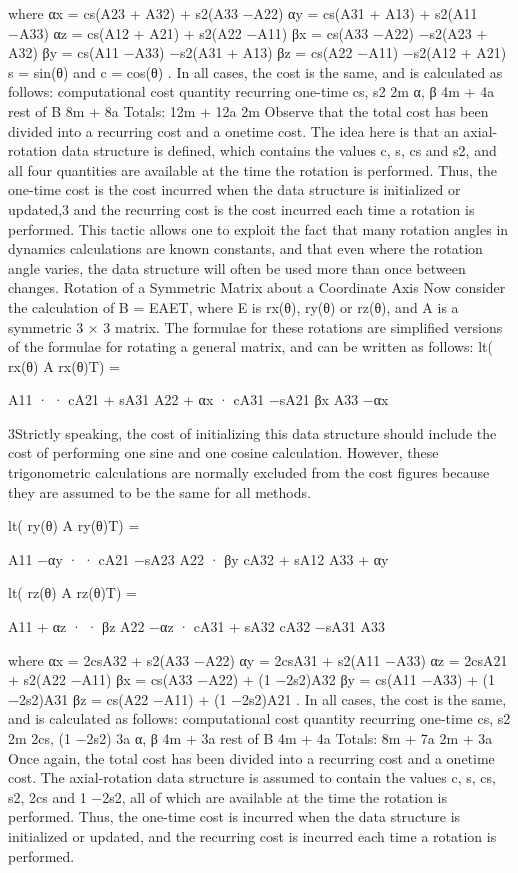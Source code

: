 where αx = cs(A23 + A32) + s2(A33 −A22) αy = cs(A31 + A13) + s2(A11 −A33) αz = cs(A12 + A21) + s2(A22 −A11) βx = cs(A33 −A22) −s2(A23 + A32) βy = cs(A11 −A33) −s2(A31 + A13) βz = cs(A22 −A11) −s2(A12 + A21) s = sin(θ) and c = cos(θ) . In all cases, the cost is the same, and is calculated as follows: computational cost quantity recurring one-time cs, s2 2m α, β 4m + 4a rest of B 8m + 8a Totals: 12m + 12a 2m Observe that the total cost has been divided into a recurring cost and a onetime cost. The idea here is that an axial-rotation data structure is defined, which contains the values c, s, cs and s2, and all four quantities are available at the time the rotation is performed. Thus, the one-time cost is the cost incurred when the data structure is initialized or updated,3 and the recurring cost is the cost incurred each time a rotation is performed. This tactic allows one to exploit the fact that many rotation angles in dynamics calculations are known constants, and that even where the rotation angle varies, the data structure will often be used more than once between changes. Rotation of a Symmetric Matrix about a Coordinate Axis Now consider the calculation of B = EAET, where E is rx(θ), ry(θ) or rz(θ), and A is a symmetric 3 × 3 matrix. The formulae for these rotations are simplified versions of the formulae for rotating a general matrix, and can be written as follows: lt( rx(θ) A rx(θ)T) =

A11 · · cA21 + sA31 A22 + αx · cA31 −sA21 βx A33 −αx

3Strictly speaking, the cost of initializing this data structure should include the cost of performing one sine and one cosine calculation. However, these trigonometric calculations are normally excluded from the cost figures because they are assumed to be the same for all methods.

lt( ry(θ) A ry(θ)T) =

A11 −αy · · cA21 −sA23 A22 · βy cA32 + sA12 A33 + αy

lt( rz(θ) A rz(θ)T) =

A11 + αz · · βz A22 −αz · cA31 + sA32 cA32 −sA31 A33

where αx = 2csA32 + s2(A33 −A22) αy = 2csA31 + s2(A11 −A33) αz = 2csA21 + s2(A22 −A11) βx = cs(A33 −A22) + (1 −2s2)A32 βy = cs(A11 −A33) + (1 −2s2)A31 βz = cs(A22 −A11) + (1 −2s2)A21 . In all cases, the cost is the same, and is calculated as follows: computational cost quantity recurring one-time cs, s2 2m 2cs, (1 −2s2) 3a α, β 4m + 3a rest of B 4m + 4a Totals: 8m + 7a 2m + 3a Once again, the total cost has been divided into a recurring cost and a onetime cost. The axial-rotation data structure is assumed to contain the values c, s, cs, s2, 2cs and 1 −2s2, all of which are available at the time the rotation is performed. Thus, the one-time cost is incurred when the data structure is initialized or updated, and the recurring cost is incurred each time a rotation is performed.
